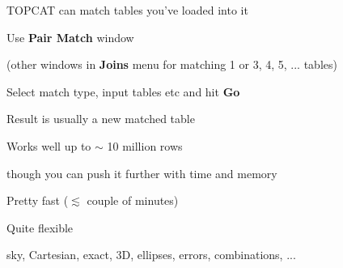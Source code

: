 \documentclass[20pt,landscape]{foils}
\newcommand{\buttimg}[1]
           {\mbox{\vtop{\vskip-2ex\hbox{\texttt{[image: \#1]}}}}}
\begin{document}
\begin{list0}
  \item TOPCAT can match tables you've loaded into it
  \begin{list2big}
    \item Use \buttimg{matchTwo2.png} {\bf Pair Match} window
    \begin{list3}
      \item (other windows in {\bf Joins} menu for
             matching 1 or 3, 4, 5, ... tables)
    \end{list3}
    \item Select match type, input tables etc and hit {\bf Go}
    \item Result is usually a new matched table
  \end{list2big}
  \item Works well up to $\sim$ 10 million rows
  \begin{list3}
    \item though you can push it further with time and memory
  \end{list3}
  \item Pretty fast ($\lesssim$ couple of minutes)
  \item Quite flexible
  \begin{list3}
    \item sky, Cartesian, exact, 3D, ellipses, errors, combinations, ...
  \end{list3}
\end{list0}

\end{document}
